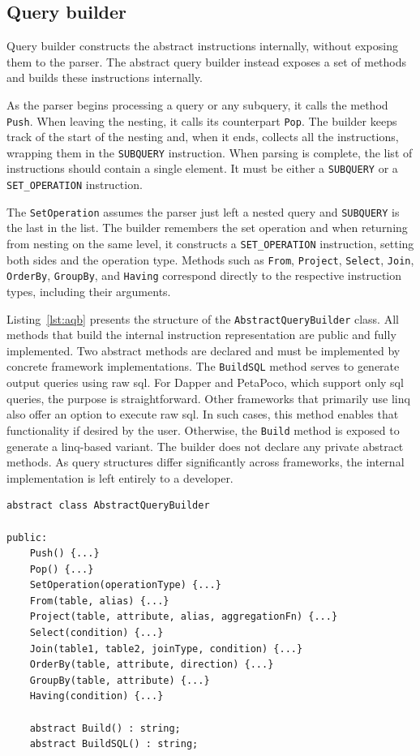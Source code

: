 \subsection{Query builder}

Query builder constructs the abstract instructions internally, without exposing them to the parser. The abstract query builder instead exposes a set of methods and builds these instructions internally.

As the parser begins processing a query or any subquery, it calls the method \texttt{Push}. When leaving the nesting, it calls its counterpart \texttt{Pop}. The builder keeps track of the start of the nesting and, when it ends, collects all the instructions, wrapping them in the \texttt{SUBQUERY} instruction. When parsing is complete, the list of instructions should contain a single element. It must be either a \texttt{SUBQUERY} or a \texttt{SET\_OPERATION} instruction.

The \texttt{SetOperation} assumes the parser just left a nested query and \texttt{SUBQUERY} is the last in the list. The builder remembers the set operation and when returning from nesting on the same level, it constructs a \texttt{SET\_OPERATION} instruction, setting both sides and the operation type.
Methods such as \texttt{From}, \texttt{Project}, \texttt{Select}, \texttt{Join}, \texttt{OrderBy}, \texttt{GroupBy}, and \texttt{Having} correspond directly to the respective instruction types, including their arguments. 

Listing~\ref{lst:aqb} presents the structure of the \texttt{AbstractQueryBuilder} class. All methods that build the internal instruction representation are public and fully implemented. Two abstract methods are declared and must be implemented by concrete framework implementations. The \texttt{BuildSQL} method serves to generate output queries using raw \acrshort{sql}. For Dapper and PetaPoco, which support only \acrshort{sql} queries, the purpose is straightforward. Other frameworks that primarily use \acrshort{linq} also offer an option to execute raw \acrshort{sql}. In such cases, this method enables that functionality if desired by the user. Otherwise, the \texttt{Build} method is exposed to generate a \acrshort{linq}-based variant. The builder does not declare any private abstract methods. As query structures differ significantly across frameworks, the internal implementation is left entirely to a developer.

 \begin{lstlisting}[caption={AbstractQueryBuilder class structure}, language=pseudo, label={lst:aqb}]
abstract class AbstractQueryBuilder
    
public: 
    Push() {...}
    Pop() {...}
    SetOperation(operationType) {...}
    From(table, alias) {...}
    Project(table, attribute, alias, aggregationFn) {...}
    Select(condition) {...}
    Join(table1, table2, joinType, condition) {...}
    OrderBy(table, attribute, direction) {...}
    GroupBy(table, attribute) {...}
    Having(condition) {...}
    
    abstract Build() : string;
    abstract BuildSQL() : string;
 \end{lstlisting}

